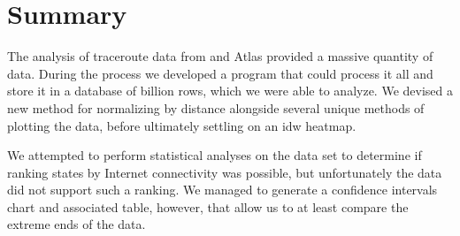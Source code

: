 \section{Summary}

The analysis of traceroute data from \caida and \ripe Atlas provided a massive quantity of data. During the process we developed a program that could process it all and store it in a database of  billion rows, which we were able to analyze. We devised a new method for normalizing by distance alongside several unique methods of plotting the data, before ultimately settling on an \acrfull{idw} heatmap.

We attempted to perform statistical analyses on the data set to determine if ranking states by Internet connectivity was possible, but unfortunately the data did not support such a ranking. We managed to generate a confidence intervals chart and associated table, however, that allow us to at least compare the extreme ends of the data.
